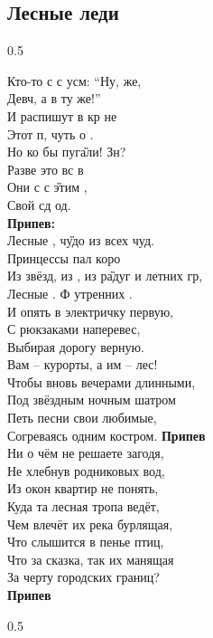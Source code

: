 \documentclass[fleqn,a5paper,12pt,twoside]{guitartabs}
\newcommand{\musVspace}{\vspace{2mm}}
\begin{document}
\subsection*{Лесные леди}\begin{spacing}{0.5}
\end{spacing}
    Кто-то с с усм: ``Ну,  же, \\
    Девч, а в ту же!'' \\
    И распишут в кр не\\ 
    Этот п, чуть о .\\
    Но ко бы пуг\G{али}! Зн?\\ 
    Разве  это вс в \\
    Они с с \G{этим} , \\
    Свой  сд од.\musVspace\\
    \-\hspace{10mm}\textbf{Припев:}\\
    \-\hspace{10mm}Лесные , ч\G{удо} из всех чуд.\\ 
    \-\hspace{10mm}Принцессы  пал коро\\
    \-\hspace{10mm}Из звёзд, из , из р\G{адуг} и летних гр,\\
    \-\hspace{10mm}Лесные . Ф утренних . \musVspace\\
    И опять в электричку первую, \\
    С рюкзаками наперевес, \\
    Выбирая дорогу верную. \\
    Вам -- курорты, а им -- лес! \\
    Чтобы вновь вечерами длинными,\\ 
    Под звёздным ночным шатром \\
    Петь песни свои любимые, \\
    Согреваясь одним костром.
    \newpage
    \-\hspace{10mm}\textbf{Припев}\\
    Ни о чём не решаете загодя,\\
    Не хлебнув родниковых вод,\\
    Из окон квартир не понять,\\
    Куда та лесная тропа ведёт,\\
    Чем влечёт их река бурлящая,\\
    Что слышится в пенье птиц, \\
    Что за сказка, так их манящая \\
    За черту городских границ?\musVspace\\
    \-\hspace{10mm}\textbf{Припев}\begin{spacing}{0.5}\end{spacing}
\end{document}
